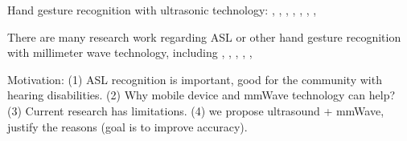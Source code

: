 \documentclass[11pt, oneside]{article}   	%
\begin{document}
Hand gesture recognition with ultrasonic technology:
\cite{ref:usgr17}, \cite{ref:usgdr21}, \cite{ref:usgr19}, \cite{ref:echoflex17}, \cite{ref:usgr18}, \cite{ref:mhgr18}, \cite{ref:hgr22}, 

There are many research work regarding ASL or other hand gesture recognition with millimeter wave technology, including \cite{ref:mmasl}, \cite{ref:espasl}, 
\cite{ref:hgrmmv21}, \cite{ref:slgrmmw22}, \cite{ref:aslmmv21}, \cite{ref:tidemo18}

Motivation: (1) ASL recognition is important, good for the community with hearing disabilities. (2) Why mobile device and mmWave technology can help? (3) Current research has limitations. (4) we propose ultrasound + mmWave, justify the reasons (goal is to improve accuracy).



\end{document}

